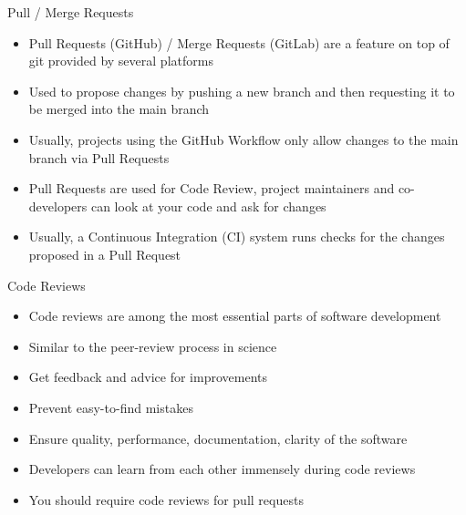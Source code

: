\begin{frame}[c]{Pull / Merge Requests}
  \begin{itemize}
    \item Pull Requests (GitHub) / Merge Requests (GitLab) are a feature on top of git provided by several platforms
    \item Used to propose changes by pushing a new branch and then requesting it to be merged into the main branch
    \item Usually, projects using the GitHub Workflow only allow changes to the main branch via Pull Requests
    \item Pull Requests are used for Code Review, project maintainers and co-developers can look at your code and
      ask for changes
    \item Usually, a Continuous Integration (CI) system runs checks for the changes proposed in a Pull Request
  \end{itemize}
\end{frame}

\begin{frame}[c]{Code Reviews}
  \begin{itemize}
    \item Code reviews are among the most essential parts of software development
    \item Similar to the peer-review process in science
    \item Get feedback and advice for improvements
    \item Prevent easy-to-find mistakes
    \item Ensure quality, performance, documentation, clarity of the software
    \item Developers can learn from each other immensely during code reviews
    \item You should require code reviews for pull requests
  \end{itemize}
\end{frame}

